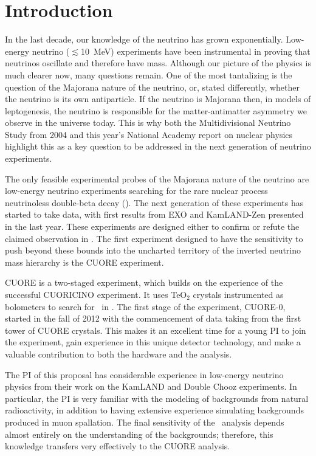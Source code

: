 

\section{Introduction}
In the last decade, our knowledge of the neutrino has grown exponentially. Low-energy neutrino ($\lesssim$10~MeV) experiments have been instrumental in proving that neutrinos oscillate and therefore have mass. Although our picture of the physics is much clearer now, many questions remain. One of the most tantalizing is the question of the Majorana nature of the neutrino, or, stated differently, whether the neutrino is its own antiparticle. If the neutrino is Majorana then, in models of leptogenesis, the neutrino is responsible for the matter-antimatter  asymmetry we observe in the universe today. This is why both the Multidivisional Neutrino Study from 2004\cite{numatrix}  and this year's National Academy report on nuclear physics\cite{national2012Nuclear} highlight this as a key question to be addressed in the next generation of neutrino experiments.

The only feasible experimental probes of the Majorana nature of the neutrino are low-energy neutrino experiments searching for the rare nuclear process neutrinoless double-beta decay (\zeronu). The next generation of these experiments has started to take data, with first results from EXO\cite{EXO2012} and KamLAND-Zen\cite{KZ2nu} presented in the last year. These experiments are designed either to confirm or refute the claimed observation in \isoge\cite{KKK2006}. The first experiment designed to have the sensitivity to push beyond these bounds into the uncharted territory of the inverted neutrino mass hierarchy is the CUORE experiment. 

CUORE is a two-staged experiment, which builds on the experience of the successful CUORICINO experiment\cite{CC2008}. It uses TeO$_{2}$ crystals instrumented as bolometers to search for \zeronu~in \isomain. The first stage of the experiment, CUORE-0, started in the fall of 2012 with the commencement of data taking from the first tower of CUORE crystals. This makes it an excellent time for a young PI to join the experiment, gain experience in this unique detector technology, and make a valuable contribution to both the hardware and the analysis.

The PI of this proposal has considerable experience in low-energy neutrino physics from their work on the KamLAND and Double Chooz experiments. In particular, the PI is very familiar with the modeling of backgrounds from natural radioactivity, in addition to having extensive experience simulating backgrounds produced in muon spallation. The final sensitivity of the \zeronu~analysis depends almost entirely on the understanding of the backgrounds; therefore, this knowledge transfers very effectively to the CUORE analysis.

